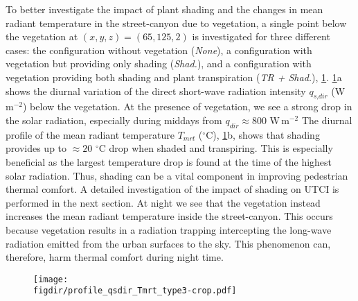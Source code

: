 To better investigate the impact of plant shading and the changes in mean radiant temperature in the street-canyon due to vegetation, a single point below the vegetation at $(x,y,z) = (65, 125, 2)$ is investigated for three different cases: the configuration without vegetation (\textit{None}), a configuration with vegetation but providing only shading (\textit{Shad.}), and a configuration with vegetation providing both shading and plant transpiration (\textit{TR + Shad.}), \cref{fig:profile_qsdir_Tmrt}. \cref{fig:profile_qsdir_Tmrt}a shows the diurnal variation of the direct short-wave radiation intensity $q_{\textit{s,dir}}$ (W\,m$^{-2}$) below the vegetation. At the presence of vegetation, we see a strong drop in the solar radiation, especially during middays from $q_{dir} \approx 800$ W\,m$^{-2}$  The diurnal profile of the mean radiant temperature $T_{\textit{mrt}}$ ($^{\circ}$C), \cref{fig:profile_qsdir_Tmrt}b, shows that shading provides up to $\approx 20$ $^{\circ}$C drop when shaded and transpiring. This is especially beneficial as the largest temperature drop is found at the time of the highest solar radiation. Thus, shading can be a vital component in improving pedestrian thermal comfort. A detailed investigation of the impact of shading on UTCI is performed in the next section. At night we see that the vegetation instead increases the mean radiant temperature inside the street-canyon. This occurs because vegetation results in a radiation trapping intercepting the long-wave radiation emitted from the urban surfaces to the sky. This phenomenon can, therefore, harm thermal comfort during night time.   

\begin{figure}[p]
	\centering
	\texttt{[image: \\figdir/profile\_qsdir\_Tmrt\_type3-crop.pdf]}
	\caption{}
	\label{fig:profile_qsdir_Tmrt}
\end{figure}

